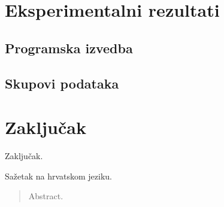 \documentclass[utf8, diplomski, lmodern]{fer}
\begin{document}
\chapter{Eksperimentalni rezultati}


\section{Programska izvedba}


\section{Skupovi podataka}



\chapter{Zaključak}

Zaključak.




\begin{sazetak}
Sažetak na hrvatskom jeziku.

\end{sazetak}

\begin{abstract}
Abstract.

\end{abstract}
\end{document}
